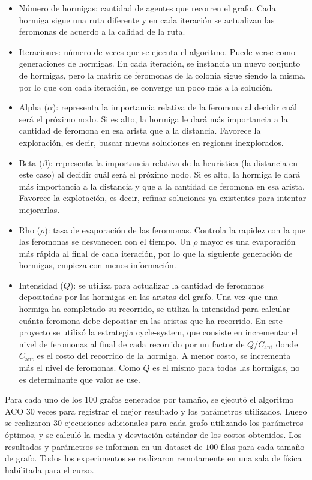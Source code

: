 \documentclass[conference]{IEEEtran}
\begin{document}
\begin{itemize}
\item Número de hormigas: cantidad de agentes que recorren el grafo. Cada hormiga sigue una ruta diferente y en cada iteración se actualizan las feromonas de acuerdo a la calidad de la ruta.
\item Iteraciones: número de veces que se ejecuta el algoritmo. Puede verse como generaciones de hormigas. En cada iteración, se instancia un nuevo conjunto de hormigas, pero la matriz de feromonas de la colonia sigue siendo la misma, por lo que con cada iteración, se converge un poco más a la solución.
\item Alpha ($\alpha$): representa la importancia relativa de la feromona al decidir cuál será el próximo nodo. Si es alto, la hormiga le dará más importancia a la cantidad de feromona en esa arista que a la distancia. Favorece la exploración, es decir, buscar nuevas soluciones en regiones inexplorados.
\item Beta ($\beta$): representa la importancia relativa de la heurística (la distancia en este caso) al decidir cuál será el próximo nodo. Si es alto, la hormiga le dará más importancia a la distancia y que a la cantidad de feromona en esa arista. Favorece la explotación, es decir, refinar soluciones ya existentes para intentar mejorarlas.
\item Rho ($\rho$): tasa de evaporación de las feromonas. Controla la rapidez con la que las feromonas se desvanecen con el tiempo. Un $\rho$ mayor es una evaporación más rápida al final de cada iteración, por lo que la siguiente generación de hormigas, empieza con menos información.
\item Intensidad ($Q$): se utiliza para actualizar la cantidad de feromonas depositadas por las hormigas en las aristas del grafo. Una vez que una hormiga ha completado su recorrido, se utiliza la intensidad para calcular cuánta feromona debe depositar en las aristas que ha recorrido. En este proyecto se utilizó la estrategia cycle-system, que consiste en incrementar el nivel de feromonas al final de cada recorrido por un factor de $Q/C_{\text{ant}}$ donde $C_{\text{ant}}$ es el costo del recorrido de la hormiga. A menor costo, se incrementa más el nivel de feromonas. Como $Q$ es el mismo para todas las hormigas, no es determinante que valor se use.
\end{itemize}

Para cada uno de los $100$ grafos generados por tamaño, se ejecutó el algoritmo ACO $30$ veces para registrar el mejor resultado y los parámetros utilizados. Luego se realizaron $30$ ejecuciones adicionales para cada grafo utilizando los parámetros óptimos, y se calculó la media y desviación estándar de los costos obtenidos. Los resultados y parámetros se informan en un dataset de $100$ filas para cada tamaño de grafo. Todos los experimentos se realizaron remotamente en una sala de física habilitada para el curso.
\end{document}
